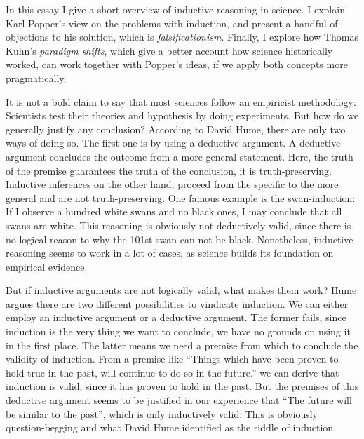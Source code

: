 In this essay I give a short overview of inductive reasoning in science.
I explain Karl Popper's view on the problems with induction,
and present a handful of objections to his solution, which is
\emph{falsificationism}.
Finally, I explore how Thomas Kuhn's \emph{paradigm shifts}, which
give a better account how science historically worked,
can work together with Popper's ideas, if
we apply both concepts more pragmatically.

It is not a bold claim to say that most sciences
follow
an empiricist methodology:
Scientists test their theories and hypothesis by doing experiments.
But how do we generally justify
any conclusion?
According to David Hume, there are only two ways of doing so.
The first one is by using a deductive argument.
A deductive argument concludes the outcome from a
more general statement. Here, the truth of the premise
guarantees the truth of the conclusion, it is truth-preserving.
Inductive inferences on the other hand, proceed from
the specific to the more general and are not
truth-preserving.
One famous example is the swan-induction:
If I observe a hundred white swans and no black ones, I may conclude
that all swans are white.
This reasoning is obviously not deductively valid, since
there is no logical reason to why the 101st swan can not be black.
Nonetheless, inductive reasoning seems to work in a lot of cases, as
science builds its foundation on empirical evidence.

But if inductive arguments are not logically valid, what makes them work?
Hume argues there are two different possibilities to vindicate induction.
We can either employ an inductive argument or a deductive argument.
The former fails, since induction is
the very thing we want to conclude, we have no grounds on
using it in the first place.
The latter means we need a premise from which to conclude the
validity of induction.
From a premise like \enquote{Things which have been proven to hold true in
    the past, will continue to do so in the future.} we can derive
that induction is valid, since it has proven to hold in the past.
But the premises of this deductive argument
seems to be justified in our experience that
\enquote{The future will be similar to the past}, which
is only inductively valid.
This is obviously question-begging and what
David Hume identified as the riddle of induction\cite[173]{philsciencebook}.

